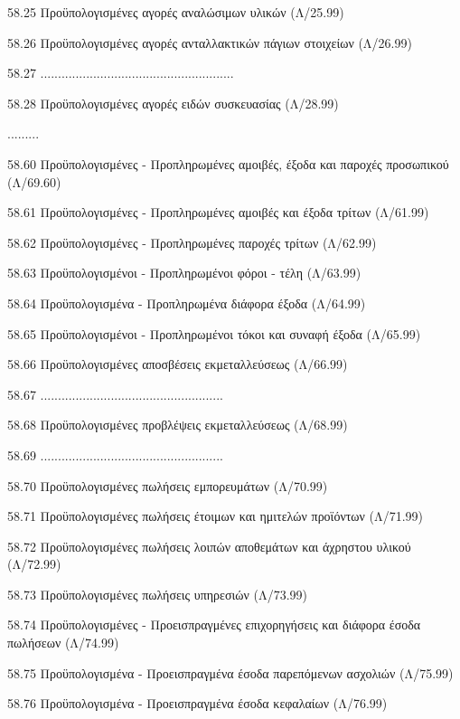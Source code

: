 \documentclass[A4,10pt,greek]{book}
\begin{document}
        58.25   Προϋπολογισμένες αγορές αναλώσιμων υλικών (Λ/25.99)

        58.26   Προϋπολογισμένες αγορές ανταλλακτικών πάγιων στοιχείων
                     (Λ/26.99)

        58.27   .......................................................

        58.28   Προϋπολογισμένες αγορές ειδών συσκευασίας (Λ/28.99)

        .........

        58.60   Προϋπολογισμένες - Προπληρωμένες αμοιβές, έξοδα και παροχές
                     προσωπικού (Λ/69.60)

        58.61   Προϋπολογισμένες - Προπληρωμένες αμοιβές και έξοδα τρίτων
                     (Λ/61.99)

        58.62   Προϋπολογισμένες - Προπληρωμένες παροχές τρίτων (Λ/62.99)

        58.63   Προϋπολογισμένοι - Προπληρωμένοι φόροι - τέλη (Λ/63.99)

        58.64   Προϋπολογισμένα - Προπληρωμένα διάφορα έξοδα (Λ/64.99)

        58.65   Προϋπολογισμένοι - Προπληρωμένοι τόκοι και συναφή έξοδα
                     (Λ/65.99)

        58.66   Προϋπολογισμένες αποσβέσεις εκμεταλλεύσεως (Λ/66.99)

        58.67   ....................................................

        58.68   Προϋπολογισμένες προβλέψεις εκμεταλλεύσεως (Λ/68.99)

        58.69   ....................................................

        58.70   Προϋπολογισμένες πωλήσεις εμπορευμάτων (Λ/70.99)

        58.71   Προϋπολογισμένες πωλήσεις έτοιμων και ημιτελών προϊόντων
                     (Λ/71.99)

        58.72   Προϋπολογισμένες πωλήσεις λοιπών αποθεμάτων και άχρηστου
                     υλικού (Λ/72.99)

        58.73   Προϋπολογισμένες πωλήσεις υπηρεσιών (Λ/73.99)

        58.74   Προϋπολογισμένες - Προεισπραγμένες επιχορηγήσεις και διάφορα
                     έσοδα πωλήσεων (Λ/74.99)

        58.75   Προϋπολογισμένα - Προεισπραγμένα έσοδα παρεπόμενων ασχολιών
                     (Λ/75.99)

        58.76   Προϋπολογισμένα - Προεισπραγμένα έσοδα κεφαλαίων (Λ/76.99)
\end{document}
